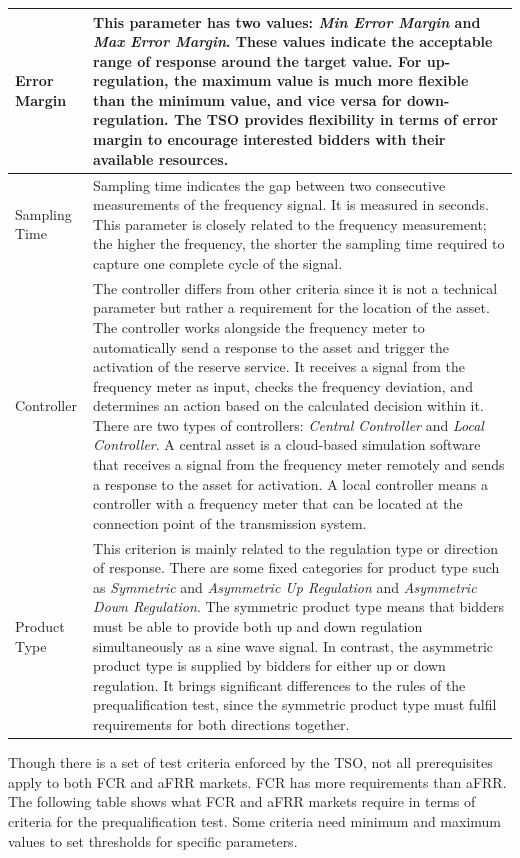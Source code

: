 \begin{longtable}{|p{3cm}|p{12cm}|}
    \hline
    Error Margin & This parameter has two values: \textit{Min Error Margin} and \textit{Max Error Margin}. These values indicate the acceptable range of response around the target value. For up-regulation, the maximum value is much more flexible than the minimum value, and vice versa for down-regulation. The TSO provides flexibility in terms of error margin to encourage interested bidders with their available resources. \\
    \hline
    Sampling Time & Sampling time indicates the gap between two consecutive measurements of the frequency signal. It is measured in seconds. This parameter is closely related to the frequency measurement; the higher the frequency, the shorter the sampling time required to capture one complete cycle of the signal. \\
    \hline
    Controller & The controller differs from other criteria since it is not a technical parameter but rather a requirement for the location of the asset. The controller works alongside the frequency meter to automatically send a response to the asset and trigger the activation of the reserve service. It receives a signal from the frequency meter as input, checks the frequency deviation, and determines an action based on the calculated decision within it. There are two types of controllers: \textit{Central Controller} and \textit{Local Controller}. A central asset is a cloud-based simulation software that receives a signal from the frequency meter remotely and sends a response to the asset for activation. A local controller means a controller with a frequency meter that can be located at the connection point of the transmission system. \\
    \hline
    Product Type & This criterion is mainly related to the regulation type or direction of response. There are some fixed categories for product type such as \textit{Symmetric} and \textit{Asymmetric Up Regulation} and \textit{Asymmetric Down Regulation}. The symmetric product type means that bidders must be able to provide both up and down regulation simultaneously as a sine wave signal. In contrast, the asymmetric product type is supplied by bidders for either up or down regulation. It brings significant differences to the rules of the prequalification test, since the symmetric product type must fulfil requirements for both directions together. \\
\end{longtable}


Though there is a set of test criteria enforced by the TSO, not all prerequisites apply to both FCR and aFRR markets. FCR has more requirements than aFRR. The following table shows what FCR and aFRR markets require in terms of criteria for the prequalification test. Some criteria need minimum and maximum values to set thresholds for specific parameters.

